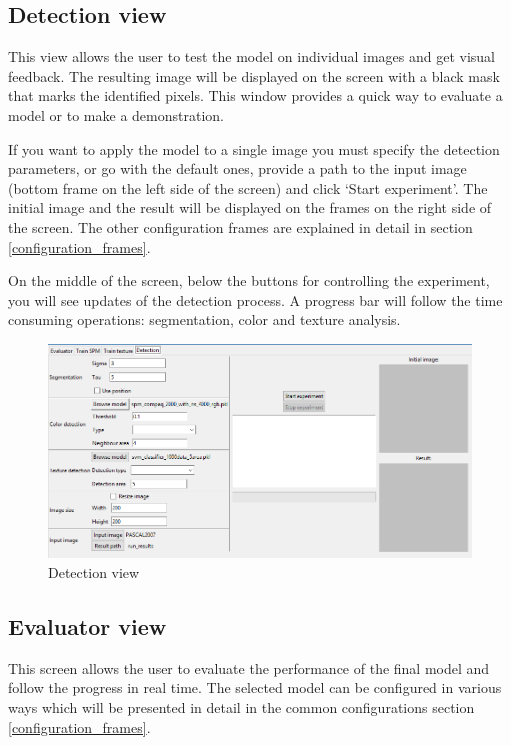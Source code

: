 \documentclass[12pt]{report}
\begin{document}
	\subsection{Detection view}
	This view allows the user to test the model on individual images and get visual feedback. The resulting image will be displayed on the screen with a black mask that marks the identified pixels. This window provides a quick way to evaluate a model or to make a demonstration.
	
	If you want to apply the model to a single image you must specify the detection parameters, or go with the default ones, provide a path to the input image (bottom frame on the left side of the screen) and click ‘Start experiment’. The initial image and the result will be displayed on the frames on the right side of the screen. The other configuration frames are explained in detail in section \ref{configuration_frames}. 
	
	On the middle of the screen, below the buttons for controlling the experiment, you will see updates of the detection process. A progress bar will follow the time consuming operations: segmentation, color and texture analysis.
	
	\begin{figure}[h!]
		\centering
		\includegraphics[width=\linewidth]{manual/detection_view.png}
		\caption{Detection view}
	\end{figure}
	
	\subsection{Evaluator view}
	
	This screen allows the user to evaluate the performance of the final model and follow the progress in real time. The selected model can be configured in various ways which will be presented in detail in the common configurations section \ref{configuration_frames}.
	
\end{document}
